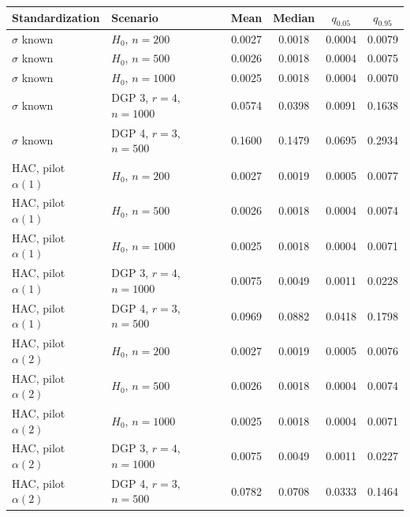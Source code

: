 \begin{tabular}{llcccc}
\toprule
Standardization & Scenario & Mean & Median & $q_{0.05}$ & $q_{0.95}$ \\
\midrule
$\sigma$ known & $H_0$, $n = 200$ & 0.0027 & 0.0018 & 0.0004 & 0.0079 \\
$\sigma$ known & $H_0$, $n = 500$ & 0.0026 & 0.0018 & 0.0004 & 0.0075 \\
$\sigma$ known & $H_0$, $n = 1000$ & 0.0025 & 0.0018 & 0.0004 & 0.0070 \\
$\sigma$ known & DGP 3, $r = 4$, $n = 1000$ & 0.0574 & 0.0398 & 0.0091 & 0.1638 \\
$\sigma$ known & DGP 4, $r = 3$, $n = 500$ & 0.1600 & 0.1479 & 0.0695 & 0.2934 \\
\addlinespace
HAC, pilot $\alpha(1)$ & $H_0$, $n = 200$ & 0.0027 & 0.0019 & 0.0005 & 0.0077 \\
HAC, pilot $\alpha(1)$ & $H_0$, $n = 500$ & 0.0026 & 0.0018 & 0.0004 & 0.0074 \\
HAC, pilot $\alpha(1)$ & $H_0$, $n = 1000$ & 0.0025 & 0.0018 & 0.0004 & 0.0071 \\
HAC, pilot $\alpha(1)$ & DGP 3, $r = 4$, $n = 1000$ & 0.0075 & 0.0049 & 0.0011 & 0.0228 \\
HAC, pilot $\alpha(1)$ & DGP 4, $r = 3$, $n = 500$ & 0.0969 & 0.0882 & 0.0418 & 0.1798 \\
\addlinespace
HAC, pilot $\alpha(2)$ & $H_0$, $n = 200$ & 0.0027 & 0.0019 & 0.0005 & 0.0076 \\
HAC, pilot $\alpha(2)$ & $H_0$, $n = 500$ & 0.0026 & 0.0018 & 0.0004 & 0.0074 \\
HAC, pilot $\alpha(2)$ & $H_0$, $n = 1000$ & 0.0025 & 0.0018 & 0.0004 & 0.0071 \\
HAC, pilot $\alpha(2)$ & DGP 3, $r = 4$, $n = 1000$ & 0.0075 & 0.0049 & 0.0011 & 0.0227 \\
HAC, pilot $\alpha(2)$ & DGP 4, $r = 3$, $n = 500$ & 0.0782 & 0.0708 & 0.0333 & 0.1464 \\
\bottomrule
\end{tabular}
